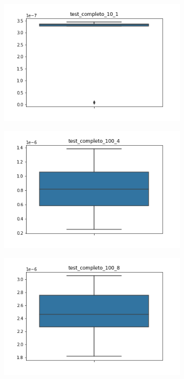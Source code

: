 \begin{figure}
\begin{subfigure}{.5\textwidth}
  \centering
  \includegraphics[width=\linewidth]{imagenes/test_completo_10_1.png}
\end{subfigure}%
\begin{subfigure}{.5\textwidth}
  \centering
  \includegraphics[width=\linewidth]{imagenes/test_completo_100_4.png}
\end{subfigure}
\begin{subfigure}{.5\textwidth}
  \centering
  \includegraphics[width=\linewidth]{imagenes/test_completo_100_8.png}

\end{subfigure}
\end{figure}
